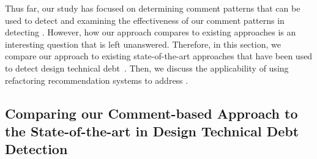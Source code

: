 


Thus far, our study has focused on determining comment patterns that can be used to detect \SADTD and examining the effectiveness of our comment patterns in detecting \SADTD. However, how our approach compares to existing approaches is an interesting question that is left unanswered. Therefore, in this section, we compare our approach to existing state-of-the-art approaches that have been used to detect design technical debt~\cite{Zazworka2011MTD}. Then, we discuss the applicability of using refactoring recommendation systems to address \SADTD. 


%
%
%
%



\subsection{Comparing our Comment-based Approach to the State-of-the-art in Design Technical Debt Detection}

